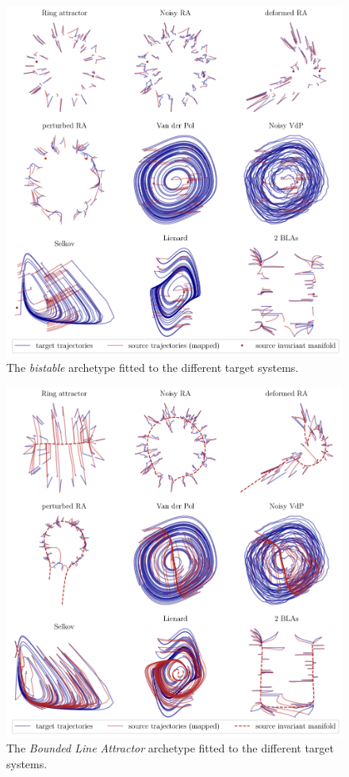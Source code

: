 \documentclass{article}
\theoremstyle{definition} \newtheorem{definition}{Definition}  \newtheorem{example}{Example}
\theoremstyle{remark} \newtheorem{remark}{Remark}
\newcounter{ct}
\begin{document}
\begin{figure}[htbp]
    \centering
    \includegraphics[width=0.95\linewidth]{bistable_traj_invman}
    \caption{The \emph{bistable} archetype fitted to the different target systems.
    }
    \label{fig:bistable_traj_invman}
\end{figure}

\begin{figure}[htbp]
    \centering
    \includegraphics[width=0.95\linewidth]{bla_traj_invman}
    \caption{The \emph{Bounded Line Attractor} archetype fitted to the different target systems.
    }
    \label{fig:bla_traj_invman}
\end{figure}
\end{document}
